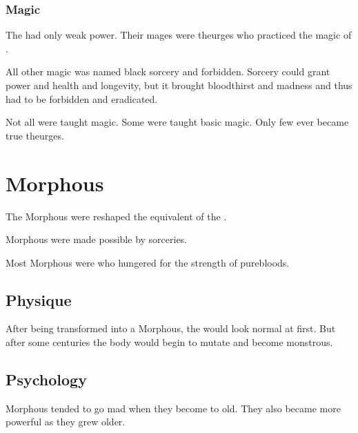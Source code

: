 \subsubsection{Magic}
The \Merkyrans had only weak power. 
Their mages were theurges who practiced the magic of . 

All other magic was named black sorcery and forbidden.
Sorcery could grant power and health and longevity, but it brought bloodthirst and madness and thus had to be forbidden and eradicated. 

Not all \resphain were taught magic.
Some were taught basic magic. 
Only few ever became true theurges.















\section{Morphous}
The Morphous were reshaped \resphain\dash the \resphan equivalent of the \human {}. 

Morphous were made possible by \bane sorceries. 

Most Morphous were \bezedeth who hungered for the strength of purebloods. 









\subsection{Physique}
After being transformed into a Morphous, the \resphan would look normal at first.
But after some centuries the body would begin to mutate and become monstrous. 









\subsection{Psychology}
Morphous tended to go mad when they become to old.
They also became more powerful as they grew older. 

